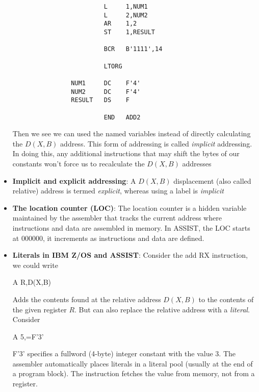 \documentclass{report}
\begin{document}
\begin{itemize}
\begin{verbatim}
                         L     1,NUM1
                         L     2,NUM2
                         AR    1,2
                         ST    1,RESULT

                         BCR   B'1111',14

                         LTORG

                NUM1     DC    F'4'
                NUM2     DC    F'4'
                RESULT   DS    F

                         END   ADD2
                    \end{verbatim}
                    \bigbreak \noindent 
                    Then we see we can used the named variables instead of directly calculating the $D(X,B)$ address. This form of addressing is called \textit{implicit} addressing. In doing this, any additional instructions that may shift the bytes of our constants won't force us to recalculate the $D(X,B)$ addresses
                \item \textbf{Implicit and explicit addressing}: A $D(X,B)$ displacement (also called relative) address is termed \textit{explicit}, whereas using a label is \textit{implicit}
                \item \textbf{The location counter (LOC)}: The location counter is a hidden variable maintained by the assembler that tracks the current address where instructions and data are assembled in memory.
                    \bigbreak \noindent 
                    In ASSIST, the LOC starts at 000000, it increments as instructions and data are defined.
                \item \textbf{Literals in IBM Z/OS and ASSIST}: Consider the add RX instruction, we could write
                    \bigbreak \noindent 
                    \begin{cppcode}
                    A R,D(X,B)
                    \end{cppcode}
                    \bigbreak \noindent 
                    Adds the contents found at the relative address $D(X,B)$ to the contents of the given register $R$. But can also replace the relative address with a \textit{literal}. Consider 
                    \bigbreak \noindent 
                    \begin{cppcode}
                    A 5,=F'3'
                    \end{cppcode}
                    \bigbreak \noindent 
                    F'3' specifies a fullword (4-byte) integer constant with the value 3. The assembler automatically places literals in a literal pool (usually at the end of a program block). The instruction fetches the value from memory, not from a register.

\end{itemize}
\end{document}
